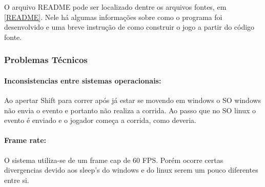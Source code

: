 O arquivo README pode ser localizado dentre os arquivos fontes, em \ref{README}. Nele há algumas informações sobre como o programa foi desenvolvido e uma breve instrução de como construir o jogo a partir do código fonte.

\subsubsection{Problemas Técnicos}\label{problens}

\paragraph{\textbf{Inconsistencias entre sistemas operacionais:}}
Ao apertar Shift para correr após já estar se movendo em windows o SO windows 
não envia o evento e portanto não realiza a corrida. Ao passo que no SO linux o evento 
é enviado e o jogador começa a corrida, como deveria.

\paragraph{\textbf{Frame rate:}}
O sistema utiliza-se de um frame cap de 60 FPS. Porém ocorre certas divergencias 
devido aos sleep's do windows e do linux serem um pouco diferentes entre si.



